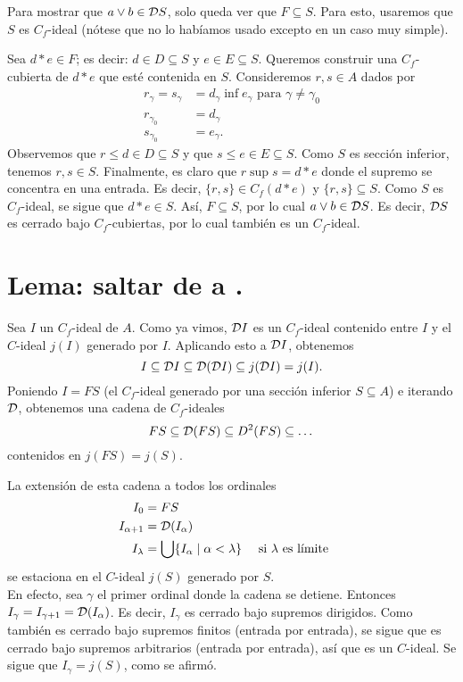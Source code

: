 Para mostrar que $a\sup b\in\D S$,
solo queda ver que $F\subseteq S$.
Para esto, usaremos que $S$ es $C_f$-ideal (nótese que no lo
habíamos usado excepto en un caso muy simple).

Sea $d*e\in F$; es decir: $d\in D\subseteq S$ y $e\in E\subseteq S$.
Queremos construir una $C_f$-cubierta de $d*e$ que esté contenida
en $S$.
Consideremos  $r,s\in A$ dados por
\begin{align*}
  r_\gamma = s_\gamma
    &= d_\gamma \inf e_\gamma \text{ para } \gamma\neq\gamma_0 \\
  r_{\gamma_0} &= d_\gamma \\
  s_{\gamma_0} &= e_\gamma.
\end{align*}
Observemos que $r\leq d\in D\subseteq S$ y que $s\leq e\in
E\subseteq S$.
Como $S$ es sección inferior, tenemos $r,s\in S$.
Finalmente, es claro que $r\sup s = d*e$ donde el supremo se
concentra en una entrada.
Es decir, $\{r,s\}\in C_f(d*e)$ y $\{r,s\}\subseteq S$.
Como $S$ es $C_f$-ideal, se sigue que $d*e\in S$.
Así, $F\subseteq S$, por lo cual $a\sup b\in\D S$.
Es decir, $\D S$ es cerrado bajo $C_f$-cubiertas, por lo cual
también es un $C_f$-ideal.

\section{Lema: saltar de  a .}
    Sea $I$ un $C_f$-ideal de $A$.
    Como ya vimos, $\D I$ es un $C_f$-ideal contenido
    entre $I$ y el $C$-ideal $j(I)$ generado por $I$.
    Aplicando esto a $\D I$, obtenemos
    \[
        I\subseteq \D I
        \subseteq \D(\D I)
        \subseteq j(\D I)=j(I)
    .\]
    Poniendo $I=FS$ (el $C_f$-ideal generado por una sección
    inferior $S\subseteq A$) e iterando $\D$, obtenemos una
    cadena de $C_f$-ideales
    \[
        FS \subseteq \cal D(FS)
        \subseteq D^2(FS)
        \subseteq \dots
    \]
    contenidos en $j(FS)=j(S)$.


    La extensión de esta cadena a todos los ordinales
    \begin{align*}
        I_0 &= FS \\
        I_{\alpha+1} &= \D(I_\alpha) \\
        I_\lambda
        &= \bigcup\{I_\alpha \mid \alpha<\lambda\}
            && \text{ si $\lambda$ es límite }
    \end{align*}
    se estaciona en el $C$-ideal $j(S)$ generado por $S$. \\
    En efecto, sea $\gamma$ el primer ordinal donde la cadena
    se detiene.
    Entonces $I_\gamma=I_{\gamma+1}=\D(I_\alpha)$.
    Es decir, $I_\gamma$ es cerrado bajo supremos dirigidos.
    Como también es cerrado bajo supremos finitos
    (entrada por entrada), se sigue
    que es cerrado bajo supremos arbitrarios
    (entrada por entrada), así que es
    un $C$-ideal.
    Se sigue que $I_\gamma=j(S)$, como se afirmó.


